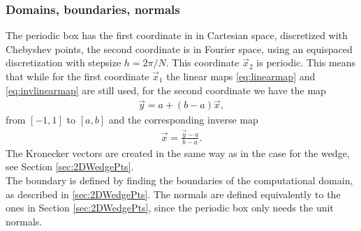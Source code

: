 \subsubsection{Domains, boundaries, normals}
The periodic box has the first coordinate in in Cartesian space, discretized with Chebyshev points, the second coordinate is in Fourier space, using an equispaced discretization with stepsize $h = 2\pi /N$. This coordinate $\vec x_2$ is periodic. 
This means that while for the first coordinate $\vec x_1$ the linear maps \eqref{eq:linearmap} and \eqref{eq:invlinearmap} are still used, for the second coordinate we have the map 
\begin{align*}
	\vec y = a + (b-a) \vec x, 
\end{align*}
from $[-1,1]$ to $[a,b]$ and the corresponding inverse map
\begin{align*}
   \vec x = \frac{\vec y- a}{b-a}.
\end{align*}
The Kronecker vectors are created in the same way as in the case for the wedge, see Section \ref{sec:2DWedgePts}.
\\
The boundary is defined by finding the boundaries of the computational domain, as described in \ref{sec:2DWedgePts}. The normals are defined equivalently to the ones in Section \ref{sec:2DWedgePts}, since the periodic box only needs the unit normals.

